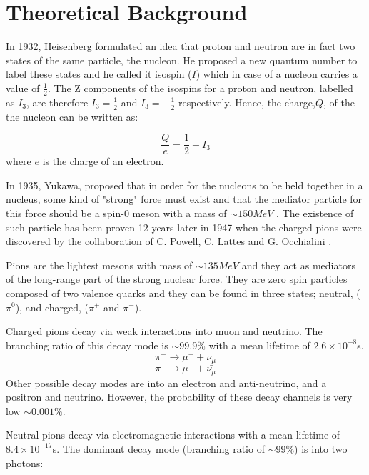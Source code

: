 \chapter{Theoretical Background}

\indent In 1932, Heisenberg formulated an idea that proton and neutron are in fact two states of the same particle, the nucleon. He proposed a new quantum number to label these states and he called it isospin ($I$) which in case of a nucleon carries a value of $\frac{1}{2}$. The Z components of the  isospins for a proton and neutron, labelled as $I_{3}$, are therefore $I_{3}=\frac{1}{2}$ and $I_{3}=-\frac{1}{2}$ respectively. Hence, the charge,$Q$, of the the nucleon can be written as:

\begin{equation}
\frac{Q}{e}=\frac{1}{2}+I_{3}
\end{equation}
where $e$ is the charge of an electron.

\indent In 1935, Yukawa, proposed that in order for the nucleons to be held together in a nucleus, some kind of "strong" force must exist and that the mediator particle for this force should be a spin-0 meson with a mass of $\sim150MeV$ \cite{dudek}. The existence of such particle has been proven 12 years later in 1947 when the charged pions were discovered by the collaboration of C. Powell, C. Lattes and G. Occhialini \cite{martin}.

\indent Pions are the lightest mesons with mass of $\sim135MeV$ and they act as mediators of the long-range part of the strong nuclear force. They are zero spin particles composed of two valence quarks and they can be found in three states; neutral, ($\pi^{0}$), and charged, ($\pi^{+}$ and $\pi^{-}$).

\indent Charged pions decay via weak interactions into muon and neutrino. The branching ratio of this decay mode is $\sim99.9\%$ with a mean lifetime of $2.6 \times 10^{-8}$s.
\begin{equation}
\pi^{+} \rightarrow \mu^{+} + \nu_{\mu}
\end{equation}
\begin{equation}
\pi^{-} \rightarrow \mu^{-} + \bar{\nu_{\mu}}
\end{equation}
Other possible decay modes are into an electron and anti-neutrino, and a positron and neutrino. However, the probability of these decay channels is very low $\sim0.001\%$.

\indent Neutral pions decay via electromagnetic interactions with a mean lifetime of $8.4 \times 10^{-17}$s. The dominant decay mode (branching ratio of $\sim99\%$) is into two photons:

